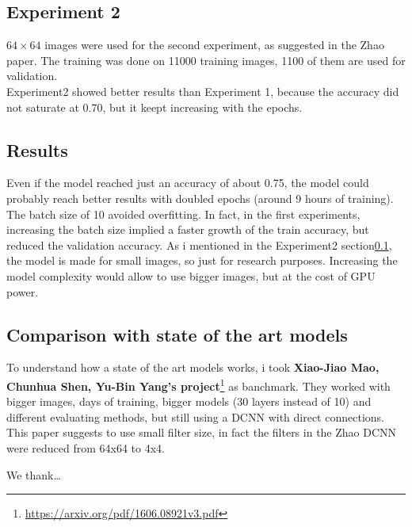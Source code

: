 \documentclass[twocolumn,showpacs,%
  nofootinbib,aps,superscriptaddress,%
  eqsecnum,prd,notitlepage,showkeys,10pt]{revtex4-1}
\begin{document}
\subsection{Experiment 2}\label{subs:ex2}
$64\times64$ images were used for the second experiment, as suggested in the Zhao paper. The training was done on 11000 training images, 1100 of them are used for validation.\\
Experiment2 showed better results than Experiment 1, because the accuracy did not saturate at 0.70, but it keept increasing with the epochs.

\subsection{Results}
Even if the model reached just an accuracy of about 0.75, the model could probably reach better results with doubled epochs (around 9 hours of training).\\
The batch size of 10 avoided overfitting. In fact, in the first experiments, increasing the batch size implied a faster growth of the train accuracy, but reduced the validation accuracy.
As i mentioned in the Experiment2 section\ref{subs:ex2}, the model is made for small images, so just for research purposes. Increasing the model complexity would allow to use bigger images, but at the cost of GPU power.

\subsection{Comparison with state of the art models}
To understand how a state of the art models works, i took \textbf{Xiao-Jiao Mao, Chunhua Shen, Yu-Bin Yang's project}\footnote{\url{https://arxiv.org/pdf/1606.08921v3.pdf}} as banchmark. They worked with bigger images, days of training, bigger models (30 layers instead of 10) and different evaluating methods, but still using a DCNN with direct connections.\\
This paper suggests to use small filter size, in fact the filters in the Zhao DCNN were reduced from 64x64 to 4x4. 

\begin{acknowledgments}

We thank\dots

\end{acknowledgments}
\end{document}

